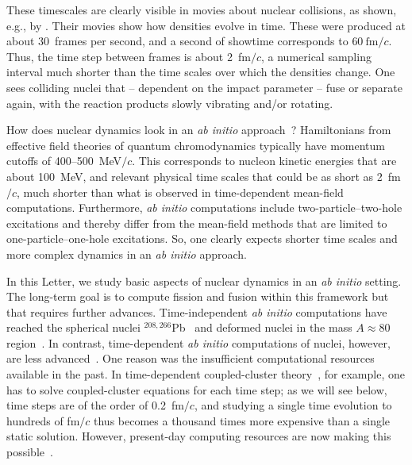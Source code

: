\documentclass[aps,prc,twocolumn,showpacs,floatfix,nofootinbib,superscriptaddress,amsmath,amssymb,longbibliography,amsproc]{revtex4-2}
\begin{document}
These timescales are clearly visible in movies about nuclear collisions, as shown, e.g., by \textcite{sekizawa2016}. Their movies show how densities evolve in time. These were produced at about 30~frames per second, and a second of showtime corresponds to $60~\mathrm{fm}/c$. Thus, the time step between frames is about 2~fm$/c$, a numerical sampling interval much shorter than the time scales over which the densities change. One sees colliding nuclei that  -- dependent on the impact parameter -- fuse or separate again, with the reaction products slowly vibrating and/or rotating.

How does nuclear dynamics look in an \textit{ab initio} approach~\cite{ekstrom2023}? Hamiltonians from effective field theories of quantum chromodynamics typically have momentum cutoffs
of 400--500~MeV$/c$. This corresponds to nucleon kinetic energies that are about 100~MeV, and relevant physical time scales that could be as short as 2~fm$/c$, much shorter than what is observed in time-dependent mean-field computations. Furthermore, \textit{ab initio} computations include two-particle--two-hole excitations and thereby differ from the mean-field methods that are limited to one-particle--one-hole excitations. So, one clearly expects shorter time scales and more complex dynamics in an \textit{ab initio} approach.

In this Letter, we study basic aspects of nuclear dynamics in an \textit{ab initio} setting. The long-term goal is to compute fission and fusion within this framework but that requires further advances. Time-independent \textit{ab initio} computations have reached the spherical nuclei $^{208,266}$Pb~\cite{hu2022,bonaiti2025a} and deformed nuclei in the mass $A\approx 80$ region~\cite{hu2024}. In contrast, time-dependent \textit{ab initio} computations of nuclei, however, are less advanced~\cite{pigg2012}. One reason was the insufficient computational resources available in the past. In time-dependent coupled-cluster theory~\cite{hoodbhoy78,hoodbhoy79,kvaal2012,sverdrupofstad2020}, for example, one has to solve coupled-cluster equations for each time step; as we will see below, time steps are of the order of 0.2~fm$/c$, and studying a single time evolution to hundreds of
fm$/c$ thus becomes a thousand times more expensive than a single static solution. However, present-day computing resources are now making this possible~\cite{bonaiti2025b}.
\end{document}
